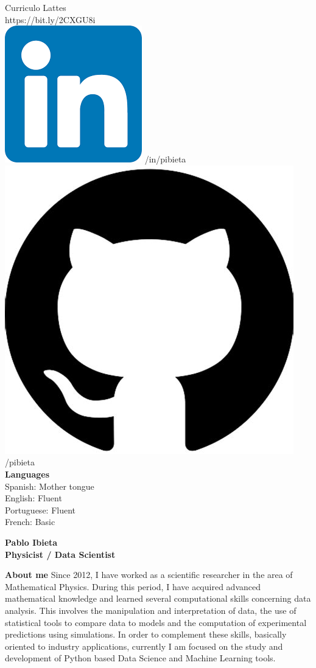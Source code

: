 \documentclass[a4paper,12pt,final]{memoir}
\newcommand{\Sep}{\vspace{1.5em}}
\newenvironment{AboutMe}
	{\ignorespaces\textbf{\color{RoyalBlue} About me}}
	{\Sep\ignorespacesafterend}
\begin{document}
\begin{flushleft}
	\vspace{1mm}
	Curriculo Lattes \\
	\vspace{1mm}
	https://bit.ly/2CXGU8i\\
	\vspace{1mm}
    \includegraphics[width=0.07\columnwidth]{in_icon.png} /in/pibieta \\
    \vspace{1mm}
    \includegraphics[width=0.07\columnwidth]{git.jpeg} /pibieta \\
    \vspace{1mm}
    \vspace{4mm}
	\textbf{Languages}\\
	\vspace{1mm}
	Spanish: Mother tongue\\
	\vspace{1mm}
	English: Fluent\\
	\vspace{1mm}
	Portuguese: Fluent\\
	\vspace{1mm}
	French: Basic
	\vspace{1mm}
\end{flushleft}\normalsize


\framebreak



\Huge\bfseries {\color{RoyalBlue} Pablo Ibieta} \\
\Large\bfseries Physicist / Data Scientist \\

\normalsize\normalfont

\begin{AboutMe}
Since 2012, I have worked as a scientific researcher in the area of Mathematical Physics. During this period, I have acquired advanced mathematical knowledge and learned several computational skills concerning data analysis. This involves the manipulation and interpretation of data, the use of statistical tools to compare data to models and the computation of experimental predictions using simulations. In order to complement these skills, basically oriented to industry applications, currently I am focused on the study and development of Python based Data Science and Machine Learning tools. 
\end{AboutMe}
 
\end{document}
